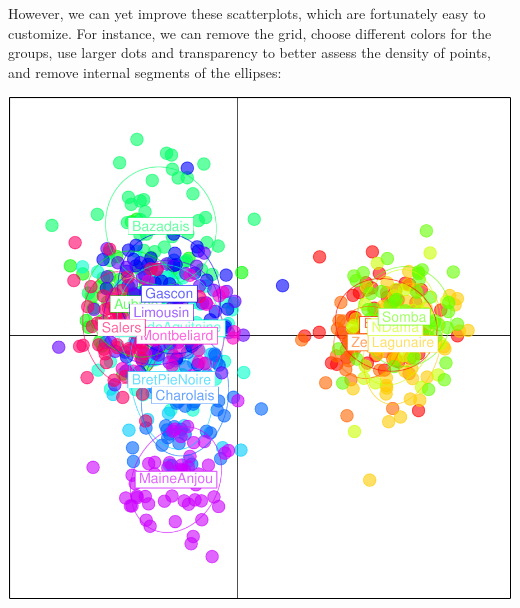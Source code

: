 \documentclass{article}
\begin{document}
However, we can yet improve these scatterplots, which are fortunately easy to customize.
For instance, we can remove the grid, choose different colors for the groups, use larger dots and transparency to
better assess the density of points, and remove internal segments of the ellipses:
\begin{Schunk}
\end{Schunk}
\includegraphics{figs/base-073}
~\\
\end{document}
